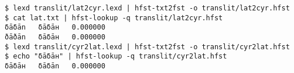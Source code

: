 \begin{code_frame}[float]
    \begin{footnotesize}\codespacing
    \begin{verbatim}
$ lexd translit/lat2cyr.lexd | hfst-txt2fst -o translit/lat2cyr.hfst
$ cat lat.txt | hfst-lookup -q translit/lat2cyr.hfst
δāδān   δāδāн   0.000000
ðāðān   δāδāн   0.000000
$ lexd translit/cyr2lat.lexd | hfst-txt2fst -o translit/cyr2lat.hfst
$ echo "δāδāн" | hfst-lookup -q translit/cyr2lat.hfst
δāδāн   δāδān   0.000000
    \end{verbatim}
    \end{footnotesize}
    \tcblower
    \label{code:7_3}
\end{code_frame}

\FloatBarrier